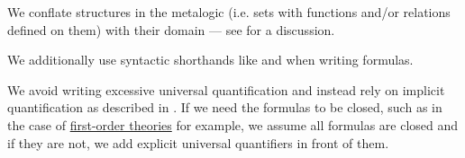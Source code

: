 \begin{remark}
\begin{thmenum}
     We conflate structures in the metalogic (i.e. sets with functions and/or relations defined on them) with their domain --- see  for a discussion.

     We additionally use syntactic shorthands like  and  when writing formulas.

     We avoid writing excessive universal quantification and instead rely on implicit quantification as described in . If we need the formulas to be closed, such as in the case of \hyperref[def:first_order_theory]{first-order theories} for example, we assume all formulas are closed and if they are not, we add explicit universal quantifiers in front of them.
  \end{thmenum}
\end{remark}

